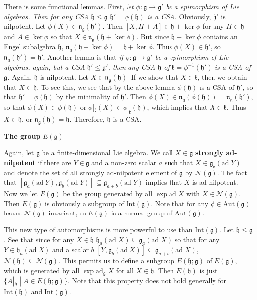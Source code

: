 \documentclass{article}
\newcommand{\SBar}{\;|\;}
\newcommand{\lie}[1]{\mathfrak{#1}}
\newcommand{\ad}[1]{\mathrm{ad}\; #1}
\newcommand{\adu}[2]{\mathrm{ad}_{#1}\; #2}
\begin{document}
There is some functional lemmas.
First, \textit{let $\phi : \lie{g} \to \lie{g}'$ be a epimorphism of Lie algebras. Then for any CSA $\lie{h} \le \lie{g}$ $\lie{h}' = \phi(\lie{h})$ is a CSA.}
Obviously, $\lie{h}'$ is nilpotent.
Let $\phi(X) \in \lie{n}_\lie{g}(\lie{h}')$.
Then $[X, H + A] \in \lie{h} + \ker{\phi}$ for any $H \in \lie{h}$ and $A \in \ker{\phi}$ so that $X \in \lie{n}_\lie{g}(\lie{h} + \ker{\phi})$.
But since $\lie{h} + \ker{\phi}$ contains an Engel subalgebra $\lie{h}$, $\lie{n}_\lie{g}(\lie{h} + \ker{\phi}) = \lie{h} + \ker{\phi}$.
Thus $\phi(X) \in \lie{h}'$, so $\lie{n}_\lie{g}(\lie{h}') = \lie{h}'$.
Another lemma is that \textit{if $\phi : \lie{g} \to \lie{g}'$ be a epimorphism of Lie algebras, again, but a CSA $\lie{h}' \le \lie{g}'$, then any CSA $\lie{h}$ of $\lie{k} = \phi^{-1} (\lie{h}')$ is a CSA of $\lie{g}$.}
Again, $\lie{h}$ is nilpotent.
Let $X \in \lie{n}_\lie{g}(\lie{h})$.
If we show that $X \in \lie{k}$, then we obtain that $X \in \lie{h}$.
To see this, we see that by the above lemma $\phi(\lie{h})$ is a CSA of $\lie{h}'$, so that $\lie{h}' = \phi(\lie{h})$ by the minimality of $\lie{h}'$.
Then $\phi(X) \in \lie{n}_\lie{g}(\phi(\lie{h})) = \lie{n}_\lie{g}(\lie{h}')$, so that $\phi(X) \in \phi(\lie{h})$ or $\phi|_\lie{k}(X) \in \phi|_\lie{k}(\lie{h})$, which implies that $X \in \lie{k}$.
Thus $X \in \lie{h}$, or $\lie{n}_\lie{g}(\lie{h}) = \lie{h}$.
Therefore, $\lie{h}$ is a CSA.

\newpage

\textbf{The group $E(\lie{g})$}

Again, let $\lie{g}$ be a finite-dimensional Lie algebra.
We call $X \in \lie{g}$ \textbf{strongly ad-nilpotent} if there are $Y \in \lie{g}$ and a non-zero scalar $a$ such that $X \in \lie{g}_a(\ad{Y})$ and denote the set of all strongly ad-nilpotent element of $\lie{g}$ by $\mathcal{N}(\lie{g})$.
The fact that $[\lie{g}_a(\ad{Y}), \lie{g}_b(\ad{Y})] \subseteq \lie{g}_{a + b}(\ad{Y})$ implies that $X$ is ad-nilpotent.
Now we let $E(\lie{g})$ be the group generated by all $\exp{\ad{X}}$ with $X \in \mathcal{N}(\lie{g})$.
Then $E(\lie{g})$ is obviously a subgroup of $\textrm{Int}(\lie{g})$.
Note that for any $\phi \in \textrm{Aut}(\lie{g})$ leaves $\mathcal{N}(\lie{g})$ invariant, so $E(\lie{g})$ is a normal group of $\textrm{Aut}(\lie{g})$.

This new type of automorphisms is more powerful to use than $\textrm{Int}(\lie{g})$.
Let $\lie{h} \le \lie{g}$.
See that since for any $X \in \lie{h}$ $\lie{h}_a(\ad{X}) \subseteq \lie{g}_a(\ad{X})$ so that for any $Y \in \lie{h}_a(\ad{X})$ and a scalar $b$ $[Y, \lie{g}_b(\ad{X})] \subseteq \lie{g}_{a + b}(\ad{X})$, $\mathcal{N}(\lie{h}) \subseteq \mathcal{N}(\lie{g})$.
This permits us to define a subgroup $E(\lie{h}; \lie{g})$ of $E(\lie{g})$, which is generated by all $\exp{\adu{\lie{g}}{X}}$ for all $X \in \lie{h}$.
Then $E(\lie{h})$ is just $\{A|_\lie{h} \SBar A \in E(\lie{h}; \lie{g})\}$.
Note that this property does not hold generally for $\textrm{Int}(\lie{h})$ and $\textrm{Int}(\lie{g})$.
\end{document}
